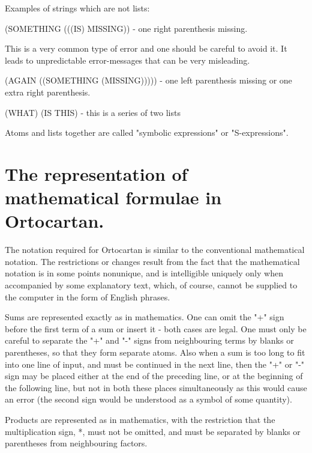 \bigskip

Examples of strings which are not lists:

\bigskip

     (SOMETHING (((IS) MISSING)) - one right parenthesis missing.

\bigskip

\noindent This is a very common type of error and one should be careful to
avoid it. It leads to unpredictable error-messages that can be very misleading.

\bigskip

(AGAIN ((SOMETHING  (MISSING)))))  -  one  left  parenthesis missing or one
extra right parenthesis.

\bigskip

     (WHAT) (IS THIS) - this is a series of two lists

\bigskip

Atoms and lists together are called  "symbolic  expressions" or
"S-expressions".

\section{The representation of mathematical formulae in Ortocartan.}

The notation required for Ortocartan is similar to  the
     conventional  mathematical  notation.  The  restrictions  or
     changes result from the fact that the mathematical  notation
     is  in  some  points nonunique, and is intelligible uniquely
     only when accompanied by some explanatory  text,  which,  of
     course,  cannot  be  supplied to the computer in the form of
     English phrases.

Sums are represented exactly as in mathematics. One can
     omit  the  "+" sign before the first term of a sum or insert
it - both cases are legal. One must only be careful to  separate the "+" and
"-" signs from neighbouring terms by blanks
     or parentheses, so that they form separate atoms. Also  when
     a sum is too long to fit into one line of input, and must be
     continued in the next line, then the "+" or "-" sign may  be
     placed either at the end of the preceding line,  or  at  the
     beginning of the following line,  but  not  in  both  these
places simultaneously as this would cause an error (the second sign would be
understood as a symbol of some quantity).

Products are represented as in  mathematics,  with  the
     restriction that the multiplication sign,  *,  must  not  be
     omitted, and must be separated by blanks or parentheses from
     neighbouring factors.

